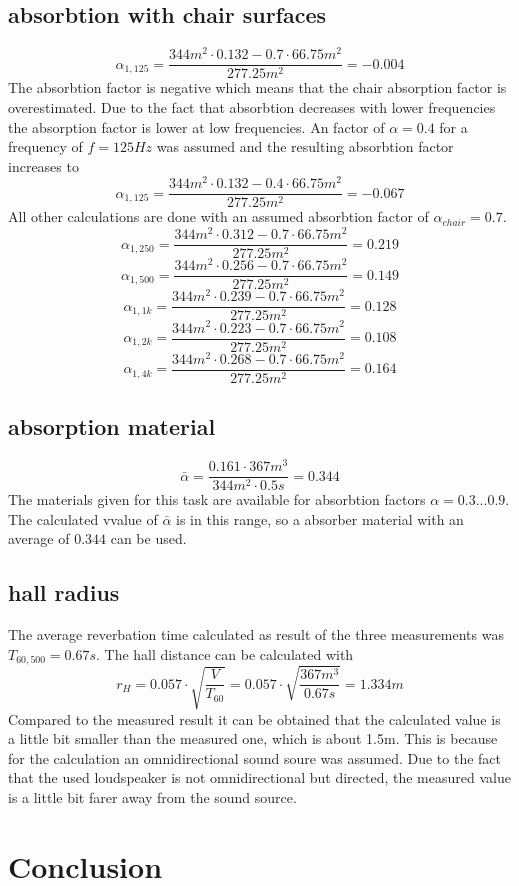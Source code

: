 \documentclass{article}
\begin{document}
\subsection{absorbtion with chair surfaces}
$$\alpha_{1,125}=\frac{344m^2\cdot 0.132-0.7\cdot 66.75m^2}{277.25m^2}=-0.004$$
The absorbtion factor is negative which means that the chair absorption factor is overestimated. Due to the fact that absorbtion decreases with lower frequencies the absorption factor is lower at low frequencies.  An factor of $\alpha=0.4$ for a frequency of $f=125Hz$ was assumed and the resulting absorbtion factor increases to
 $$\alpha_{1,125}=\frac{344m^2\cdot 0.132-0.4\cdot 66.75m^2}{277.25m^2}=-0.067$$
All other calculations are done with an assumed absorbtion factor of $\alpha_{chair}=0.7$.
 $$\alpha_{1,250}=\frac{344m^2\cdot 0.312-0.7\cdot 66.75m^2}{277.25m^2}=0.219$$
 $$\alpha_{1,500}=\frac{344m^2\cdot 0.256-0.7\cdot 66.75m^2}{277.25m^2}=0.149$$
 $$\alpha_{1,1k}=\frac{344m^2\cdot 0.239-0.7\cdot 66.75m^2}{277.25m^2}=0.128$$
 $$\alpha_{1,2k}=\frac{344m^2\cdot 0.223-0.7\cdot 66.75m^2}{277.25m^2}=0.108$$
 $$\alpha_{1,4k}=\frac{344m^2\cdot 0.268-0.7\cdot 66.75m^2}{277.25m^2}=0.164$$

\subsection{absorption material}
$$\bar{\alpha}=\frac{0.161\cdot 367m^3}{344m^2\cdot 0.5s}=0.344$$
The materials given for this task are available for absorbtion factors $\alpha=0.3 ... 0.9$. The calculated vvalue of $\bar{\alpha}$ is in this range, so a absorber material with an average of $0.344$ can be used.

\subsection{hall radius}
The average reverbation time calculated as result of the three measurements was $T_{60,500}=0.67s$. The hall distance can be calculated with 
$$r_H=0.057\cdot\sqrt{\frac{V}{T_{60}}}=0.057\cdot\sqrt{\frac{367m^3}{0.67s}}=1.334m$$
Compared to the measured result it can be obtained that the calculated value is a little bit smaller than the measured one, which is about 1.5m. This is because for the calculation an omnidirectional sound soure was assumed. Due to the fact that the used loudspeaker is not omnidirectional but directed, the measured value is a little bit farer away from the sound source. 

\newpage
\section{Conclusion}
\end{document}
